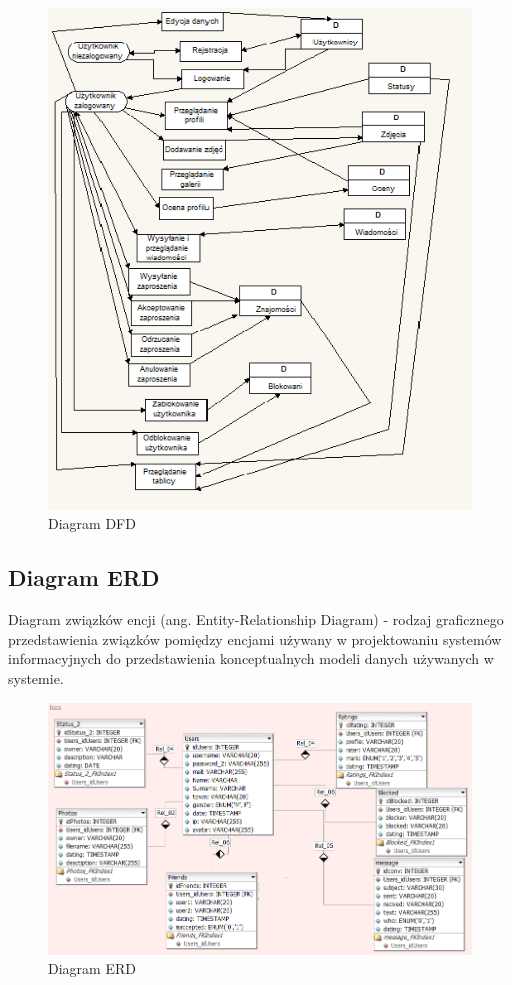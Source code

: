 \documentclass[a4paper,10pt,table]{article}
\begin{document}
\begin{figure}[h]
\begin{center}
\includegraphics[scale=0.9]{dfd}
\caption{Diagram DFD}
\end{center}
\end{figure}
\newpage
\subsection{Diagram ERD}
Diagram związków encji (ang. Entity-Relationship Diagram) - rodzaj graficznego przedstawienia związków pomiędzy encjami używany w projektowaniu systemów informacyjnych do przedstawienia konceptualnych modeli danych używanych w systemie.
\begin{figure}[h]
\begin{center}
\includegraphics[scale=0.7]{erd}
\caption{Diagram ERD}
\end{center}
\end{figure}
\end{document}
